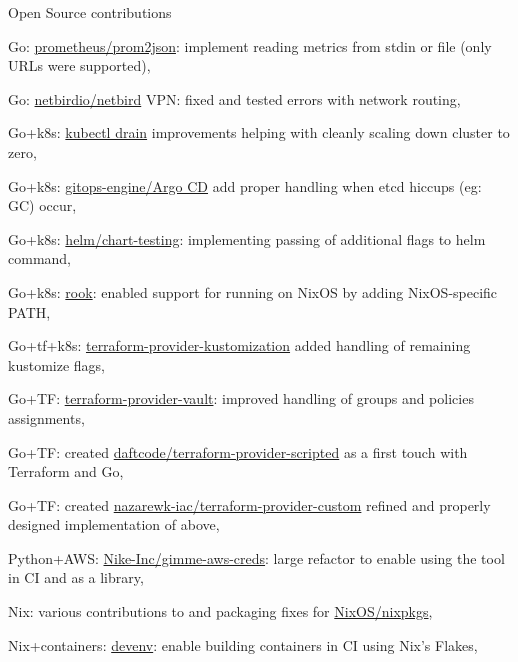 \begin{cventries}
  \cventry
  {Open Source contributions} %
  {} %
  {} %
  {} %
  {
    \begin{cvitems} %
      \item {Go: \href{https://github.com/prometheus/prom2json/pull/35}{prometheus/prom2json}: implement reading metrics from stdin or file (only URLs were supported),}
      \item {Go: \href{https://github.com/netbirdio/netbird/pull/612}{netbirdio/netbird} VPN: fixed and tested errors with network routing,}
      \item {Go+k8s: \href{https://github.com/kubernetes/kubernetes/pull/109361}{kubectl drain} improvements helping with cleanly scaling down cluster to zero,}
      \item {Go+k8s: \href{https://github.com/argoproj/gitops-engine/pull/461}{gitops-engine/Argo CD} add proper handling when etcd hiccups (eg: GC) occur,}
      \item {Go+k8s: \href{https://github.com/helm/chart-testing/pull/396}{helm/chart-testing}: implementing passing of additional flags to helm command,}
      \item {Go+k8s: \href{https://github.com/rook/rook/pull/9967}{rook}: enabled support for running on NixOS by adding NixOS-specific PATH,}
      \item {Go+tf+k8s: \href{https://github.com/kbst/terraform-provider-kustomization/pull/220}{terraform-provider-kustomization} added handling of remaining kustomize flags, }
      \item {Go+TF: \href{https://github.com/hashicorp/terraform-provider-vault/pull/321}{terraform-provider-vault}: improved handling of groups and policies assignments,}
      \item {Go+TF: created \href{https://github.com/daftcode/terraform-provider-scripted}{daftcode/terraform-provider-scripted} as a first touch with Terraform and Go,}
      \item {Go+TF: created \href{https://github.com/nazarewk-iac/terraform-provider-custom}{nazarewk-iac/terraform-provider-custom} refined and properly designed implementation of above,}
      \item {Python+AWS: \href{https://github.com/Nike-Inc/gimme-aws-creds/pull/119}{Nike-Inc/gimme-aws-creds}: large refactor to enable using the tool in CI and as a library,}
      \item {Nix: various contributions to and packaging fixes for \href{https://github.com/NixOS/nixpkgs}{NixOS/nixpkgs},}
      \item {Nix+containers: \href{https://github.com/cachix/devenv/pull/503}{devenv}: enable building containers in CI using Nix's Flakes,}
    \end{cvitems}
  }

\end{cventries}
